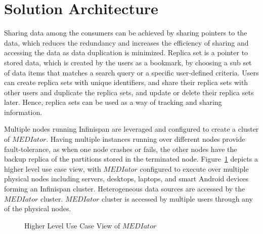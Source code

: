 \documentclass[letterpaper, 10 pt, conference]{ieeeconf}  %
\begin{document}
\section{Solution Architecture}
Sharing data among the consumers can be achieved by sharing pointers to the data, which reduces the redundancy and increases the efficiency of sharing and accessing the data as data duplication is minimized. Replica set is a pointer to stored data, which is created by the users as a bookmark, by choosing a sub set of data items that matches a search query or a specific user-defined criteria. Users can create replica sets with unique identifiers, and share their replica sets with other users and duplicate the replica sets, and update or delete their replica sets later. Hence, replica sets can be used as a way of tracking and sharing information. 

Multiple nodes running Infinispan are leveraged and configured to create a cluster of $MEDIator$. Having multiple instances running over different nodes provide fault-tolerance, as when one node crashes or fails, the other nodes have the backup replica of the partitions stored in the terminated node. Figure~\ref{fig:deployment} depicts a higher level use case view, with $MEDIator$ configured to execute over multiple physical nodes including servers, desktops, laptops, and smart Android devices forming an Infinispan cluster. Heterogeneous data sources are accessed by the $MEDIator$ cluster. $MEDIator$ cluster is accessed by multiple users through any of the physical nodes.
\begin{figure}[!h]
	\begin{center}
		\vspace{-15pt}
	\end{center}
	\caption{Higher Level Use Case View of $MEDIator$}
	\label{fig:deployment}
	\vspace{-18pt}
\end{figure}
\end{document}
